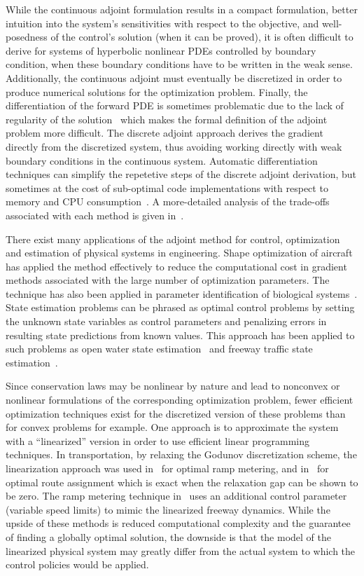 While the continuous adjoint formulation results in a compact formulation, 
better intuition into the system's sensitivities with respect to the objective, 
and well-posedness of the control's solution (when it can be proved), it is 
often difficult to derive for systems of hyperbolic nonlinear PDEs controlled 
by boundary condition, when these boundary conditions have to be written in the 
weak sense.
Additionally, the continuous adjoint must eventually be discretized in order to 
produce numerical solutions for the optimization problem. Finally, the 
differentiation of the forward PDE is sometimes problematic due to the lack of 
regularity of the solution~\cite{work2010traffic,garavello2006traffic} which 
makes the formal definition of the adjoint problem more difficult.
The discrete adjoint approach derives the gradient directly from the 
discretized system, thus avoiding working directly with weak boundary 
conditions in the continuous system. Automatic differentiation techniques can 
simplify the repetetive 
steps of the discrete adjoint derivation, but sometimes at the cost of 
sub-optimal code implementations with respect to memory and CPU 
consumption~\cite{Giles}. A more-detailed analysis of the trade-offs associated 
with each method is given in~\cite{Giles}.

There exist many applications of the adjoint method for control, optimization 
and estimation of physical systems in engineering. Shape optimization of 
aircraft~\cite{Reuther1996,Giles1997,Moin1994} has applied the method 
effectively to reduce the computational cost in gradient methods associated 
with the large number of optimization parameters. The technique has also been 
applied in parameter identification of biological systems~\cite{Raffard2008}. 
State estimation problems can be phrased as optimal control problems by setting 
the unknown state variables as control parameters and penalizing errors in 
resulting state predictions from known values. This approach has been applied 
to such problems as open water state estimation~\cite{Castaings2006,Strub2009} 
and freeway traffic state estimation~\cite{Jacqueta}.

Since conservation laws may be nonlinear by nature and lead to nonconvex or 
nonlinear formulations of the corresponding optimization problem, fewer 
efficient optimization techniques exist for the 
discretized version of these problems than for convex problems for example. One 
approach is to approximate the system with a ``linearized'' version in order to 
use efficient linear programming techniques. In transportation, by 
relaxing the Godunov discretization scheme, the linearization approach was used 
in~\cite{gomes2006optimal} for optimal ramp metering, and 
in~\cite{ziliaskopoulos2000linear} for optimal route assignment which is exact 
when the relaxation gap can be shown to be zero. The ramp 
metering technique in~\cite{Muralidharana} uses an additional control parameter 
(variable speed limits) to mimic the linearized freeway dynamics. While the 
upside of these methods is reduced computational complexity and the guarantee 
of finding a globally optimal solution, the downside is that the model of the 
linearized physical system may greatly differ from the actual system to which 
the control policies would be applied.


